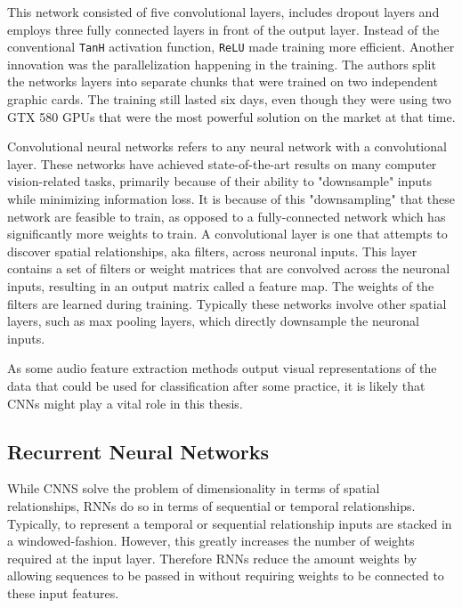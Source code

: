 This network consisted of five convolutional layers, includes dropout layers and employs three fully connected layers in front of the output layer. Instead of the conventional \texttt{TanH} activation function, \texttt{ReLU} made training more efficient.
Another innovation was the parallelization happening in the training. The authors split the networks layers into separate chunks that were trained on two independent graphic cards. The training still lasted six days, even though they were using two GTX 580 GPUs that were the most powerful solution on the market at that time.


Convolutional neural networks refers to any neural network with a convolutional layer.  These networks have achieved state-of-the-art results on many computer vision-related tasks, primarily because of their ability to "downsample" inputs while minimizing information loss.  It is because of this "downsampling" that these network are feasible to train, as opposed to a fully-connected network which has significantly more weights to train.  A convolutional layer is one that attempts to discover spatial relationships, aka filters, across neuronal inputs.
This layer contains a set of filters or weight matrices that are convolved across the neuronal inputs, resulting in an output matrix called a feature map.  The weights of the filters are learned during training.  Typically these networks involve other spatial layers, such as max pooling layers, which directly downsample the neuronal inputs.

As some audio feature extraction methods output visual representations of the data that could be used for classification after some practice, it is likely that CNNs might play a vital role in this thesis. 

\subsection{Recurrent Neural Networks}

While CNNS solve the problem of dimensionality in terms of spatial relationships, RNNs do so in terms of sequential or temporal relationships.  Typically, to represent a temporal or sequential relationship inputs are stacked in a windowed-fashion.  However, this greatly increases the number of weights required at the input layer.  Therefore RNNs reduce the amount weights by allowing sequences to be passed in without requiring weights to be connected to these input features.


